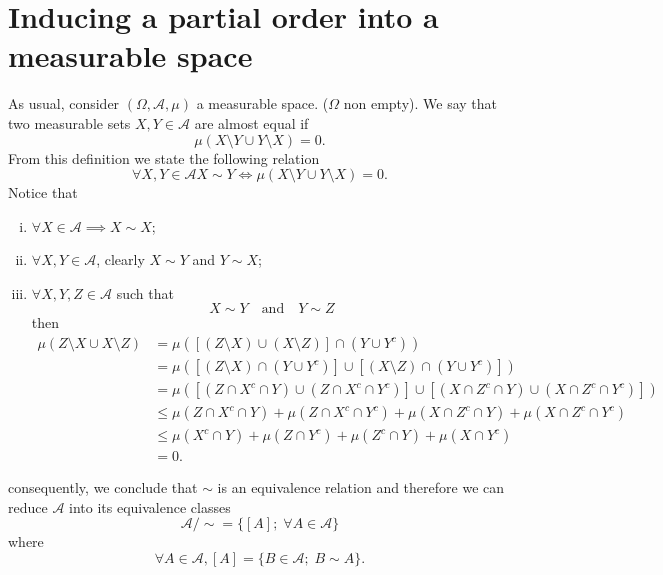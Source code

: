 \documentclass[11pt,twoside,a4paper]{article}
\begin{document}
\section{Inducing a partial order into a measurable space}
As usual, consider $(\Omega, \mathcal{A}, \mu)$ a measurable space.
($\Omega$ non empty). We say that two measurable sets $X,Y \in \mathcal{A}$  
are almost equal if 
\begin{equation*}
    \mu( X \setminus Y \cup Y \setminus X ) = 0.
\end{equation*}
From this definition we state the following relation
\begin{equation*}
    \forall X, Y \in \mathcal{A}
    X \sim Y \iff 
    \mu( X \setminus Y \cup Y \setminus X ) = 0.
\end{equation*}
Notice that
\begin{enumerate}[(i)]
   \item $\forall X \in \mathcal{A} \implies X \sim X$;
   
   \item $\forall X, Y \in \mathcal{A}$, clearly $X \sim Y$ 
   and $Y \sim X$;

   \item $\forall X, Y, Z \in \mathcal{A}$ such that
   \begin{equation*}
        X \sim Y \quad \text{and} \quad Y \sim Z
   \end{equation*}
   then 
   \begin{align*}
    \mu( Z \setminus X \cup X \setminus Z )
        & = \mu( [(Z \setminus X) \cup (X \setminus Z)] \cap (Y \cup Y^c) )\\
        & = \mu( [(Z \setminus X)\cap (Y \cup Y^c)]
               \cup 
               [(X \setminus Z) \cap (Y \cup Y^c)] )\\
        & = \mu( [(Z \cap X^c \cap Y) \cup (Z \cap X^c \cap Y^c)]
               \cup 
               [(X \cap Z^c \cap Y)  \cup (X \cap Z^c \cap Y^c)] )\\
        & \leq
            \mu( Z \cap X^c \cap Y)
            + \mu(Z \cap X^c \cap Y^c)
            + \mu(X \cap Z^c \cap Y) 
            + \mu(X \cap Z^c \cap Y^c)\\
        & \leq
            \mu(X^c \cap Y)
            + \mu(Z \cap Y^c)
            + \mu(Z^c \cap Y) 
            + \mu(X \cap Y^c)\\
        & = 0.
   \end{align*}
\end{enumerate}
consequently, we conclude that $\sim$ is an equivalence relation and
therefore we can reduce $\mathcal{A}$ into its equivalence classes  
\begin{equation*}
    \mathcal{A} / \sim = \{ [A]; \; \forall A \in \mathcal{A} \}
\end{equation*}
where
\begin{equation*}
    \forall A \in \mathcal{A}, [A] = \{ B \in \mathcal{A}; \; B \sim A\}.
\end{equation*}
\end{document}

